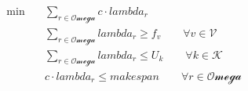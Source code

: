 \begin{align}
  \min\quad & \sum_{r \in \mathcal{Omega}} c \cdot \mathit{lambda}_{r} \tag{objective} \\
  & \sum_{r \in \mathcal{Omega}} \mathit{lambda}_{r} \ge f_{v} \qquad \forall v \in \mathcal{V} \tag{set\_covering\_visit\_node} \\
  & \sum_{r \in \mathcal{Omega}} \mathit{lambda}_{r} \le U_{k} \qquad \forall k \in \mathcal{K} \tag{vehicle\_count\_bound} \\
  & c \cdot \mathit{lambda}_{r} \le \mathit{makespan} \qquad \forall r \in \mathcal{Omega} \tag{makespan\_definition} \\
\end{align}
